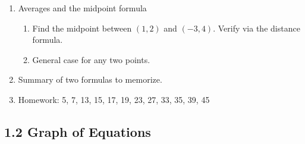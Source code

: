 \documentclass{article}
\begin{document}
\begin{enumerate}
\item Averages and the midpoint formula
\begin{enumerate}
\item Find the midpoint between $(1,2)$ and $(-3,4)$. Verify via the distance formula.
\item General case for any two points.
\end{enumerate}

\item Summary of two formulas to memorize.

\item Homework: 5, 7, 13, 15, 17, 19, 23, 27, 33, 35, 39, 45

\end{enumerate}



\subsection{1.2 Graph of Equations}
\end{document}

